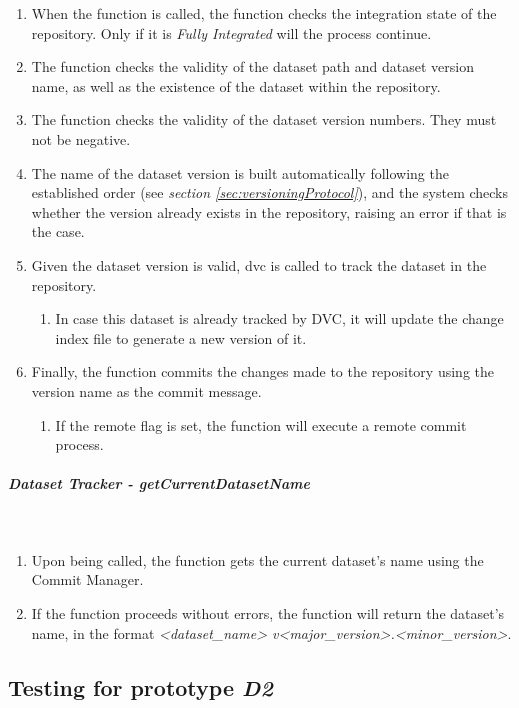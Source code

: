 \begin{enumerate}
    \item When the function is called, the function checks the integration state of the repository. Only if it is \emph{Fully Integrated} will the process continue.
    \item The function checks the validity of the dataset path and dataset version name, as well as the existence of the dataset within the repository.
    \item The function checks the validity of the dataset version numbers. They must not be negative.
    \item The name of the dataset version is built automatically following the established order (see \emph{section \ref{sec:versioningProtocol}}), and the system checks whether the version already exists in the repository, raising an error if that is the case.
    \item Given the dataset version is valid, dvc is called to track the dataset in the repository.
    \begin{enumerate}
        \item In case this dataset is already tracked by DVC, it will update the change index file to generate a new version of it.
    \end{enumerate}

    \item Finally, the function commits the changes made to the repository using the version name as the commit message.
    \begin{enumerate}
        \item If the remote flag is set, the function will execute a remote commit process.
    \end{enumerate}
\end{enumerate}


\subparagraph{Dataset Tracker - getCurrentDatasetName} \mbox{}\\

\begin{enumerate}
    \item Upon being called, the function gets the current dataset's name using the Commit Manager.
    \item If the function proceeds without errors, the function will return the dataset's name, in the format \emph{<dataset\_name> v<major\_version>.<minor\_version>}.
\end{enumerate}

\subsection{Testing for prototype \emph{D2}}


